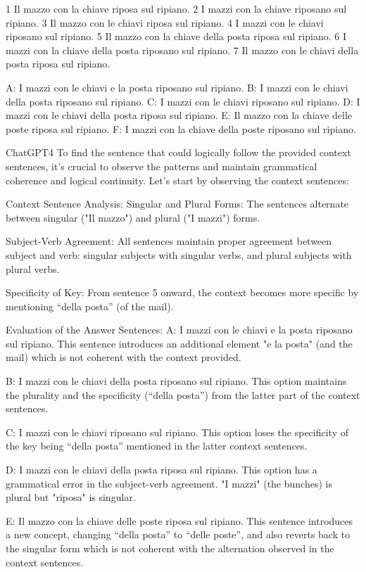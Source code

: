 1 Il mazzo con la chiave riposa sul ripiano.
2 I mazzi con la chiave riposano sul  ripiano.
3 Il mazzo con le chiavi riposa sul ripiano.
4 I mazzi con le chiavi riposano sul ripiano.
5 Il mazzo con la chiave della posta riposa sul ripiano.
6 I mazzi con la chiave della posta riposano sul ripiano.
7 Il mazzo con le chiavi della posta riposa sul ripiano.


A: I mazzi con le chiavi e la posta riposano sul  ripiano.
B: I mazzi con le chiavi della posta riposano sul ripiano.
C: I mazzi con le chiavi riposano sul ripiano.
D: I mazzi con le chiavi della posta riposa sul ripiano.
E: Il mazzo con la chiave delle poste riposa sul ripiano.
F: I mazzi con la chiave della poste riposano sul ripiano.

ChatGPT4
To find the sentence that could logically follow the provided context sentences, it’s crucial to observe the patterns and maintain grammatical coherence and logical continuity. Let's start by observing the context sentences:

Context Sentence Analysis:
Singular and Plural Forms:
The sentences alternate between singular ("Il mazzo") and plural ("I mazzi") forms.

Subject-Verb Agreement:
All sentences maintain proper agreement between subject and verb: singular subjects with singular verbs, and plural subjects with plural verbs.

Specificity of Key:
From sentence 5 onward, the context becomes more specific by mentioning “della posta” (of the mail).

Evaluation of the Answer Sentences:
A: I mazzi con le chiavi e la posta riposano sul ripiano.
This sentence introduces an additional element "e la posta" (and the mail) which is not coherent with the context provided.

B: I mazzi con le chiavi della posta riposano sul ripiano.
This option maintains the plurality and the specificity (“della posta”) from the latter part of the context sentences.

C: I mazzi con le chiavi riposano sul ripiano.
This option loses the specificity of the key being “della posta” mentioned in the latter context sentences.

D: I mazzi con le chiavi della posta riposa sul ripiano.
This option has a grammatical error in the subject-verb agreement. "I mazzi" (the bunches) is plural but "riposa" is singular.

E: Il mazzo con la chiave delle poste riposa sul ripiano.
This sentence introduces a new concept, changing “della posta” to “delle poste”, and also reverts back to the singular form which is not coherent with the alternation observed in the context sentences.

